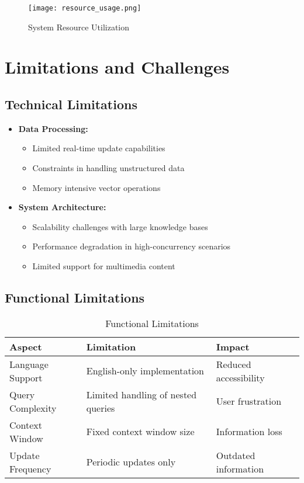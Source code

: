\documentclass[12pt,a4paper]{report}
\begin{document}
\begin{figure}
    \centering
    \texttt{[image: resource\_usage.png]}
    \caption{System Resource Utilization}
    \label{fig:resource_usage}
\end{figure}

\section{Limitations and Challenges}

\subsection{Technical Limitations}
\begin{itemize}
    \item \textbf{Data Processing:}
    \begin{itemize}
        \item Limited real-time update capabilities
        \item Constraints in handling unstructured data
        \item Memory intensive vector operations
    \end{itemize}
    
    \item \textbf{System Architecture:}
    \begin{itemize}
        \item Scalability challenges with large knowledge bases
        \item Performance degradation in high-concurrency scenarios
        \item Limited support for multimedia content
    \end{itemize}
\end{itemize}

\subsection{Functional Limitations}
\begin{table}[h]
    \centering
    \begin{tabular}{|l|p{6cm}|p{4cm}|}
        \hline
        \textbf{Aspect} & \textbf{Limitation} & \textbf{Impact} \\
        \hline
        Language Support & English-only implementation & Reduced accessibility \\
        Query Complexity & Limited handling of nested queries & User frustration \\
        Context Window & Fixed context window size & Information loss \\
        Update Frequency & Periodic updates only & Outdated information \\
        \hline
    \end{tabular}
    \caption{Functional Limitations}
    \label{tab:functional_limitations}
\end{table}
\end{document}
